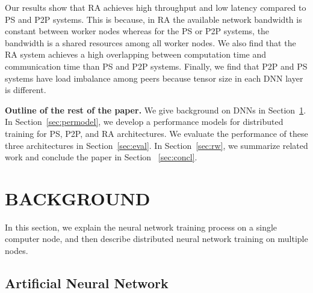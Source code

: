 \documentclass[conference]{IEEEtran}
\begin{document}


Our results show that RA achieves high throughput and low latency compared to PS and P2P systems. This is because, in RA the available network bandwidth is constant between worker nodes whereas for the PS or P2P systems, the bandwidth is a shared resources among all worker nodes.  We also find that the RA system achieves a high overlapping between computation time and communication time than PS and P2P systems. Finally, we find that P2P and PS systems have load imbalance among peers because tensor size in each DNN layer is different.

\vspace{3mm}
\noindent
{\bf Outline of the rest of the paper.} We give background on DNNs in Section~\ref{sec:back}. In Section~\ref{sec:permodel}, we develop a performance models for distributed training for PS, P2P, and RA architectures. We evaluate the performance of these three architectures in Section~\ref{sec:eval}. In Section~\ref{sec:rw}, we summarize related work and conclude the paper in Section ~\ref{sec:concl}.

\section{BACKGROUND}
\label{sec:back}

In this section, we explain the neural network training process on a single computer node, and then describe distributed neural network training on multiple nodes.

 
\subsection{Artificial Neural Network}
\label{sec:DDNNs}
\end{document}
